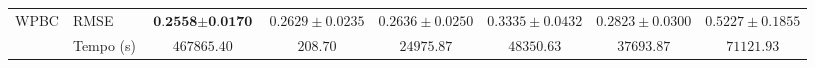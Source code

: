 \begin{landscape}
\begin{table}
\begin{tabular}{l|l|c@{\hskip 5pt}c@{\hskip 5pt}c@{\hskip 5pt}c@{\hskip 5pt}c@{\hskip 5pt}c}
            \midrule
            \multirow{2}{*}{WPBC}   & RMSE & $\textbf{0.2558} \pm \textbf{0.0170}$ & $0.2629 \pm 0.0235$ & $0.2636 \pm 0.0250$ & $0.3335 \pm 0.0432$ & $0.2823 \pm 0.0300$ & $0.5227 \pm 0.1855$ \\
                                    & Tempo (s) & $467865.40$ & $208.70$ & $24975.87$ & $48350.63$ & $37693.87$ & $71121.93$ \\
            \bottomrule
        \end{tabular}
        \begin{center}
        \end{center}
    \end{table}
\end{landscape}
